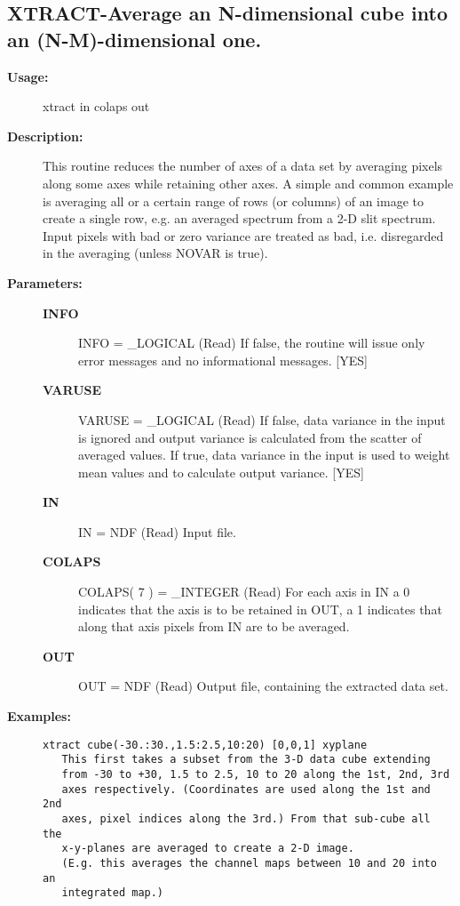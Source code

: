 \subsection{XTRACT-\label{XTRACT}Average an N-dimensional cube into an (N-M)-dimensional one.}
\begin{description}

\item [{\bf Usage:}]

   xtract in colaps out


\item [{\bf Description:}]

   This routine reduces the number of axes of a data set by averaging
   pixels along some axes while retaining other axes. A simple and
   common example is averaging all or a certain range of rows (or
   columns) of an image to create a single row, e.g. an averaged
   spectrum from a 2-D slit spectrum. Input pixels with bad or zero
   variance are treated as bad, i.e. disregarded in the averaging
   (unless NOVAR is true).

\item [{\bf Parameters:}]
\begin{description}
\item [{\bf INFO}]
INFO = _LOGICAL (Read)
   If false, the routine will issue only error messages and no
   informational messages. [YES]
\item [{\bf VARUSE}]
VARUSE = _LOGICAL (Read)
   If false, data variance in the input is ignored and output
   variance is calculated from the scatter of averaged values.
   If true, data variance in the input is used to weight mean
   values and to calculate output variance. [YES]
\item [{\bf IN}]
IN = NDF (Read)
   Input file.
\item [{\bf COLAPS}]
COLAPS( 7 ) = _INTEGER (Read)
   For each axis in IN a 0 indicates that the axis is to be
   retained in OUT, a 1 indicates that along that axis pixels
   from IN are to be averaged.
\item [{\bf OUT}]
OUT = NDF (Read)
   Output file, containing the extracted data set.
\end{description}

\item [{\bf Examples:}]
\begin{verbatim}
xtract cube(-30.:30.,1.5:2.5,10:20) [0,0,1] xyplane
   This first takes a subset from the 3-D data cube extending
   from -30 to +30, 1.5 to 2.5, 10 to 20 along the 1st, 2nd, 3rd
   axes respectively. (Coordinates are used along the 1st and 2nd
   axes, pixel indices along the 3rd.) From that sub-cube all the
   x-y-planes are averaged to create a 2-D image.
   (E.g. this averages the channel maps between 10 and 20 into an
   integrated map.)


\end{verbatim}
\end{description}
